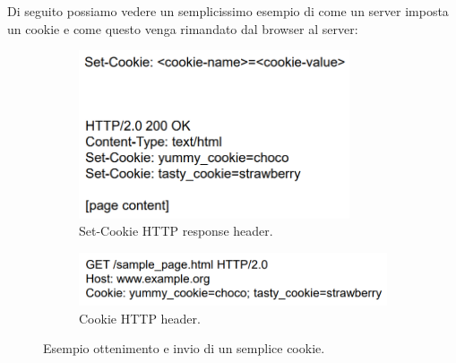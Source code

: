 \newpage

Di seguito possiamo vedere un semplicissimo esempio di come un server imposta un cookie e come questo venga rimandato dal browser al server:
\begin{figure}[ht]
	\begin{subfigure}{1\textwidth}
		\centering
		\includegraphics[width=8cm]{capitoli/web_security/imgs/set_cookie.png}  
		\caption{Set-Cookie HTTP response header.}
		\label{fig:set_cookie}
	\end{subfigure}
	
	\vspace{1.5em}
	
	\begin{subfigure}{1\textwidth}
		\centering
		\includegraphics[width=10cm]{capitoli/web_security/imgs/send_cookie.png}  
		\caption{Cookie HTTP header.}
		\label{fig:send_cookie}
	\end{subfigure}
	\caption{Esempio ottenimento e invio di un semplice cookie.}
	\label{fig:fig}
\end{figure}